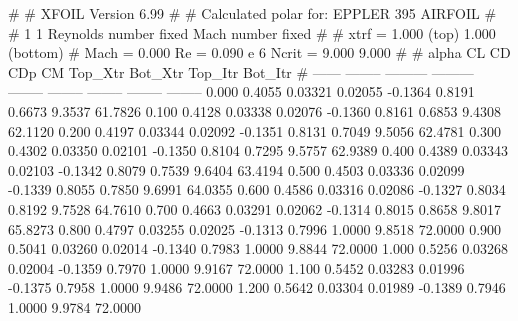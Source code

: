 #  
#       XFOIL         Version 6.99
#  
# Calculated polar for: EPPLER 395 AIRFOIL                              
#  
# 1 1 Reynolds number fixed          Mach number fixed         
#  
# xtrf =   1.000 (top)        1.000 (bottom)  
# Mach =   0.000     Re =     0.090 e 6     Ncrit =   9.000  9.000
#  
#   alpha    CL        CD       CDp       CM     Top_Xtr  Bot_Xtr  Top_Itr  Bot_Itr
#  ------ -------- --------- --------- -------- -------- -------- -------- --------
   0.000   0.4055   0.03321   0.02055  -0.1364   0.8191   0.6673   9.3537  61.7826
   0.100   0.4128   0.03338   0.02076  -0.1360   0.8161   0.6853   9.4308  62.1120
   0.200   0.4197   0.03344   0.02092  -0.1351   0.8131   0.7049   9.5056  62.4781
   0.300   0.4302   0.03350   0.02101  -0.1350   0.8104   0.7295   9.5757  62.9389
   0.400   0.4389   0.03343   0.02103  -0.1342   0.8079   0.7539   9.6404  63.4194
   0.500   0.4503   0.03336   0.02099  -0.1339   0.8055   0.7850   9.6991  64.0355
   0.600   0.4586   0.03316   0.02086  -0.1327   0.8034   0.8192   9.7528  64.7610
   0.700   0.4663   0.03291   0.02062  -0.1314   0.8015   0.8658   9.8017  65.8273
   0.800   0.4797   0.03255   0.02025  -0.1313   0.7996   1.0000   9.8518  72.0000
   0.900   0.5041   0.03260   0.02014  -0.1340   0.7983   1.0000   9.8844  72.0000
   1.000   0.5256   0.03268   0.02004  -0.1359   0.7970   1.0000   9.9167  72.0000
   1.100   0.5452   0.03283   0.01996  -0.1375   0.7958   1.0000   9.9486  72.0000
   1.200   0.5642   0.03304   0.01989  -0.1389   0.7946   1.0000   9.9784  72.0000
